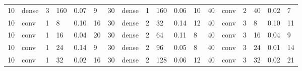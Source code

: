 \begin{table}[t!]
{\begin{tabular}{@{}llllll|llllll|llllll@{}}
10                              & dense                          & 3                              & 160                            & 0.07                             & 9                                 & 30                              & dense                          & 1                              & 160                            & 0.06                           & 10                                & 40                              & conv                           & 2                              & 40                             & 0.02                           & 7                                \\
10                              & conv                           & 1                              & 8                              & 0.10                             & 16                                & 30                              & dense                          & 2                              & 32                             & 0.14                           & 12                                & 40                              & conv                           & 3                              & 8                              & 0.10                           & 11                               \\
10                              & conv                           & 1                              & 16                             & 0.04                             & 20                                & 30                              & dense                          & 2                              & 64                             & 0.11                           & 8                                 & 40                              & conv                           & 3                              & 16                             & 0.04                           & 9                                \\
10                              & conv                           & 1                              & 24                             & 0.14                             & 9                                 & 30                              & dense                          & 2                              & 96                             & 0.05                           & 8                                 & 40                              & conv                           & 3                              & 24                             & 0.01                           & 14                               \\
10                              & conv                           & 1                              & 32                             & 0.02                             & 16                                & 30                              & dense                          & 2                              & 128                            & 0.06                           & 12                                & 40                              & conv                           & 3                              & 32                             & 0.02                           & 21                               \\

\end{tabular}}
\end{table}
